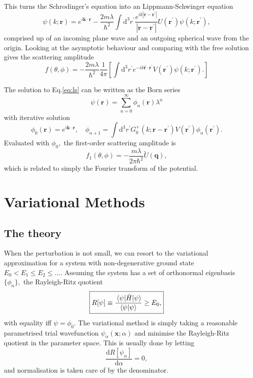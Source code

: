 \documentclass{article}
\theoremstyle{nonumberplain}
\begin{document}
This turns the Schrodinger's equation into an Lippmann-Schwinger equation
\begin{equation}
    \label{eq:ls}
    \psi(k;\mathbf{r} ) = 
    e^{i \mathbf{k} \cdot \mathbf{r} } -
    \frac{2m \lambda }{\hbar ^{2} }\int \mathrm{d} ^3 r^\prime \frac{e^{ik \left\vert \mathbf{r} -\mathbf{r^\prime }  \right\vert }}{\left\vert \mathbf{r} -\mathbf{r^\prime }  \right\vert } U(\mathbf{r^\prime }) \psi(k;\mathbf{r^\prime } ), 
\end{equation}
comprised up of an incoming plane wave and an outgoing spherical wave from the origin. Looking at the asymptotic behaviour and comparing with the free solution gives the scattering amplitude
\[
    f(\theta, \phi)
    = -\frac{2m \lambda}{\hbar ^{2}} \frac{1}{4 \pi} \left[ \int \mathrm{d}^3 r^\prime e^{-i k \mathbf{\hat{r} }\cdot \mathbf{r^\prime }  } V(\mathbf{r^\prime } )\psi(k;\mathbf{r^\prime } ). \right]
\]

The solution to Eq.\eqref{eq:ls} can be written as the Born series
\[
    \psi(\mathbf{r} ) = \sum\limits_{n=0}^{\infty} \phi_n(\mathbf{r} ) \lambda ^n
\]
with iterative solution
\[
    \phi_0(\mathbf{r} ) = e^{i \mathbf{k} \cdot \mathbf{r} }, \quad 
    \phi_{n+1} = \int \mathrm{d}^3 r^\prime G_0^{+}(k;\mathbf{r} -\mathbf{r^\prime } ) V(\mathbf{r^\prime } ) \phi_n(\mathbf{r^\prime } ). 
\]
Evaluated with $\phi_0,$ the first-order scattering amplitude is 
\[
    f_1 (\theta ,\phi ) = -\frac{m \lambda }{2\pi \hbar ^{2} }\tilde{U}(\mathbf{q} ),
\]
which is related to simply the Fourier transform of the potential. 
\section{Variational Methods}
\subsection{The theory}
When the perturbation is not small, we can resort to the variational approximation for a system with non-degenerative ground state $E_0 < E_1 \leq E_2 \leq \ldots.$ Assuming the system has a set of orthonormal eigenbasis $\{\phi_n\},$ the Rayleigh-Ritz quotient
\[
    \boxed{
    R[\psi] \equiv
    \frac{\ev{\hat{H} }{\psi}}{\braket{\psi}{\psi}}
    \geq  E_0, }
\]
with equality iff $\psi = \phi_0.$ The variational method is simply taking a reasonable parametrised trial wavefunction $\psi_\alpha (\mathbf{x}; \alpha)$ and minimise the Rayleigh-Ritz quotient in the parameter space. This is usually done by letting 
\[
    \frac{\mathrm{d}R[\psi_\alpha ]}{\mathrm{d}\alpha } =0,
\]
and normalisation is taken care of by the denominator. 
\end{document}
